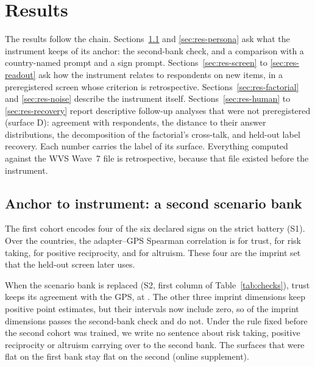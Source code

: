 \section{Results}\label{sec:results}

The results follow the chain. Sections~\ref{sec:res-bank} and \ref{sec:res-persona} ask what the instrument keeps of its anchor: the second-bank check, and a comparison with a country-named prompt and a sign prompt. Sections~\ref{sec:res-screen} to \ref{sec:res-readout} ask how the instrument relates to respondents on new items, in a preregistered screen whose criterion is retrospective. Sections~\ref{sec:res-factorial} and \ref{sec:res-noise} describe the instrument itself. Sections~\ref{sec:res-human} to \ref{sec:res-recovery} report descriptive follow-up analyses that were not preregistered (surface D): agreement with respondents, the distance to their answer distributions, the decomposition of the factorial's cross-talk, and held-out label recovery. Each number carries the label of its surface. Everything computed against the WVS Wave~7 file is retrospective, because that file existed before the instrument.

\subsection{Anchor to instrument: a second scenario bank}\label{sec:res-bank}

The first cohort encodes four of the six declared signs on the strict battery (S1). Over the  countries, the adapter--GPS Spearman correlation is   for trust,   for risk taking,   for positive reciprocity, and   for altruism. These four are the imprint set that the held-out screen later uses.

When the scenario bank is replaced (S2, first column of Table~\ref{tab:checks}), trust keeps its agreement with the GPS, at  . The other three imprint dimensions keep positive point estimates, but their intervals now include zero, so  of the  imprint dimensions passes the second-bank check and  do not. Under the rule fixed before the second cohort was trained, we write no sentence about risk taking, positive reciprocity or altruism carrying over to the second bank. The surfaces that were flat on the first bank stay flat on the second (online supplement).

